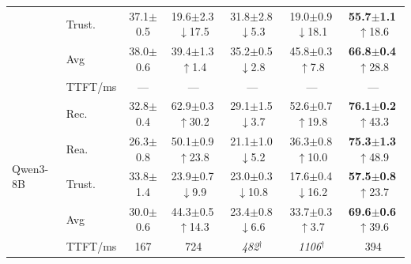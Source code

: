 \begin{table}[t]
\begin{tabular}{@{}ll c c c c | c @{}}
 & Trust. & 37.1{\scriptsize$\pm$0.5} & 19.6{\scriptsize$\pm$2.3}\,{\tiny\textcolor{red!70!black}{$\downarrow$17.5}} & 31.8{\scriptsize$\pm$2.8}\,{\tiny\textcolor{red!70!black}{$\downarrow$5.3}} & 19.0{\scriptsize$\pm$0.9}\,{\tiny\textcolor{red!70!black}{$\downarrow$18.1}} & \textbf{55.7{\scriptsize$\pm$1.1}}\,{\tiny\textcolor{green!55!black}{$\uparrow$18.6}} \\
 & Avg & 38.0{\scriptsize$\pm$0.6} & 39.4{\scriptsize$\pm$1.3}\,{\tiny\textcolor{green!55!black}{$\uparrow$1.4}} & 35.2{\scriptsize$\pm$0.5}\,{\tiny\textcolor{red!70!black}{$\downarrow$2.8}} & 45.8{\scriptsize$\pm$0.3}\,{\tiny\textcolor{green!55!black}{$\uparrow$7.8}} & \textbf{66.8{\scriptsize$\pm$0.4}}\,{\tiny\textcolor{green!55!black}{$\uparrow$28.8}} \\
 & TTFT/ms & --- & --- & --- & --- & --- \\
\midrule
\multirow{5}{*}{Qwen3-8B} & Rec. & 32.8{\scriptsize$\pm$0.4} & 62.9{\scriptsize$\pm$0.3}\,{\tiny\textcolor{green!55!black}{$\uparrow$30.2}} & 29.1{\scriptsize$\pm$1.5}\,{\tiny\textcolor{red!70!black}{$\downarrow$3.7}} & 52.6{\scriptsize$\pm$0.7}\,{\tiny\textcolor{green!55!black}{$\uparrow$19.8}} & \textbf{76.1{\scriptsize$\pm$0.2}}\,{\tiny\textcolor{green!55!black}{$\uparrow$43.3}} \\
 & Rea. & 26.3{\scriptsize$\pm$0.8} & 50.1{\scriptsize$\pm$0.9}\,{\tiny\textcolor{green!55!black}{$\uparrow$23.8}} & 21.1{\scriptsize$\pm$1.0}\,{\tiny\textcolor{red!70!black}{$\downarrow$5.2}} & 36.3{\scriptsize$\pm$0.8}\,{\tiny\textcolor{green!55!black}{$\uparrow$10.0}} & \textbf{75.3{\scriptsize$\pm$1.3}}\,{\tiny\textcolor{green!55!black}{$\uparrow$48.9}} \\
 & Trust. & 33.8{\scriptsize$\pm$1.4} & 23.9{\scriptsize$\pm$0.7}\,{\tiny\textcolor{red!70!black}{$\downarrow$9.9}} & 23.0{\scriptsize$\pm$0.3}\,{\tiny\textcolor{red!70!black}{$\downarrow$10.8}} & 17.6{\scriptsize$\pm$0.4}\,{\tiny\textcolor{red!70!black}{$\downarrow$16.2}} & \textbf{57.5{\scriptsize$\pm$0.8}}\,{\tiny\textcolor{green!55!black}{$\uparrow$23.7}} \\
 & Avg & 30.0{\scriptsize$\pm$0.6} & 44.3{\scriptsize$\pm$0.5}\,{\tiny\textcolor{green!55!black}{$\uparrow$14.3}} & 23.4{\scriptsize$\pm$0.8}\,{\tiny\textcolor{red!70!black}{$\downarrow$6.6}} & 33.7{\scriptsize$\pm$0.3}\,{\tiny\textcolor{green!55!black}{$\uparrow$3.7}} & \textbf{69.6{\scriptsize$\pm$0.6}}\,{\tiny\textcolor{green!55!black}{$\uparrow$39.6}} \\
 & TTFT/ms & 167 & 724 & \textit{482}$^\dagger$ & \textit{1106}$^\dagger$ & 394 \\

\end{tabular}
\end{table}
